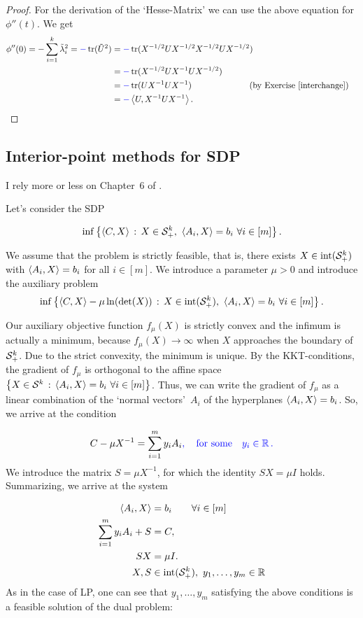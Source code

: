\begin{proof}
	For the derivation of the `Hesse-Matrix' we can use the above equation for $\phi''(t)$. We get
	\begin{align*}
		\phi''(0) = - \sum_{i=1}^k \Tilde{\lambda}_i^2 = \blue{-} \tr( \Tilde{U}^2) & = \blue{-} \tr(X^{-1/2} U X^{-1/2} X^{-1/2} U X^{-1/2} ) 	
		\\ & = \blue{-} \tr(X^{-1/2} U X^{-1} U X^{-1/2}) 
		\\ & = \blue{-} \tr(U X^{-1} U X^{-1} )  & & \text{\hspace{-.5cm}(by Exercise~\ref{interchange})}
		\\ & = \blue{-} \sprod{U}{X^{-1} U X^{-1}}.
	\end{align*}
\end{proof}


\subsection{Interior-point methods for SDP}

I rely more or less on Chapter~6 of \cite{Gaertner:Matousek:2012}.

Let's consider the SDP

\[
	\inf \left\{  \left\langle C , X \right\rangle  \,:\, X\in \mathcal{S}_+^k, \ \left\langle A_i , X \right\rangle=b_i ~ \forall i \in [m] \right\}.
\]

We assume that the problem is strictly feasible, that is, there exists $X \in \operatorname{int}(\mathcal{S}_+^k)$ with $\left\langle A_i , X \right\rangle = b_i$ for all $i \in [m]$. We introduce a parameter $\mu > 0$ and introduce the auxiliary problem
\[
	\inf \setcond{ \sprod{C}{X} - \mu \ln(\det(X)) }{X \in \intr(\cS_+^k), \ \sprod{A_i}{X} = b_i \ \forall i \in [m]}.
\]

Our auxiliary objective function $f_\mu(X)$ is strictly convex and the infimum is actually a minimum, because $f_\mu(X) \to \infty$ when $X$ approaches the boundary of~$\mathcal{S}_+^k$. Due to the strict convexity, the minimum is unique. By the KKT-conditions, the gradient of $f_\mu$ is orthogonal to the affine space $\left\{ X \in \mathcal{S}^k \,:\, \left\langle A_i , X \right\rangle=b_i \ \forall i \in [m] \right\}$. Thus, we can write the gradient of $f_\mu$ as a linear combination of the `normal vectors'~$A_i$ of the hyperplanes $\left\langle A_i , X \right\rangle=b_i$. So, we arrive at the condition 

\[
	C - \mu X^{-1} = \sum_{i=1}^m y_i A_i\textcolor{blue}{, \quad \textrm{for some} \quad y_i \in \mathbb{R} \,.}
\]
%
We introduce the matrix $S = \mu X^{-1}$, for which the identity $S X = \mu I$ holds. Summarizing, we arrive at the system

\begin{align}
	\left\langle A_i , X \right\rangle & = b_i \label{eq:lin:eq} \qquad \forall i \in [m]\\
		\sum_{i=1}^m y_i A_i + S & = C,  \label{eq:prim:dual:lin:eq}\\ 
	S X & = \mu I. \label{eq:mu:slackness}\\
	X, S & \in \operatorname{int}(\mathcal{S}_+^k),  \ y_1,\ldots,y_m \in \mathbb{R} \label{eq:prim:dual:var}
\end{align}
%
As in the case of LP, one can see that $y_1,\ldots,y_m$ satisfying the above conditions is a feasible solution of the dual problem: 

